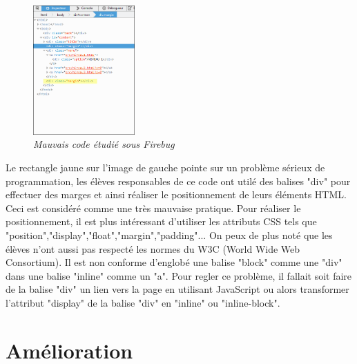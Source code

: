 \documentclass{article}
\begin{document}
\hfill
\begin{figure}
\vspace{-13pt}
\centering
\includegraphics[width=3.9cm]{3}
\caption{\textit{Mauvais code \'etudi\'e sous Firebug}}
\end{figure}
{\hspace*{0.6cm}Le rectangle jaune sur l'image de gauche pointe sur un probl\`eme s\'erieux de programmation, les \'el\`eves responsables de ce code ont util\'e des balises "div" pour effectuer des marges et ainsi r\'ealiser le positionnement de leurs \'el\'ements HTML. Ceci est consid\'er\'e comme une tr\`es mauvaise pratique. Pour r\'ealiser le positionnement, il est plus int\'eressant d'utiliser les attributs CSS tels que "position","display","float","margin","padding"... On peux de plus not\'e que les \'el\`eves n'ont aussi pas respect\'e les normes du W3C (World Wide Web Consortium). Il est non conforme d'englob\'e une balise "block" comme une "div" dans une balise "inline" comme un "a". Pour regler ce probl\`eme, il fallait soit faire de la balise "div" un lien vers la page en utilisant JavaScript ou alors transformer l'attribut "display" de la balise "div" en "inline" ou "inline-block".}\\

\newpage

\section{Am\'elioration}
\end{document}
